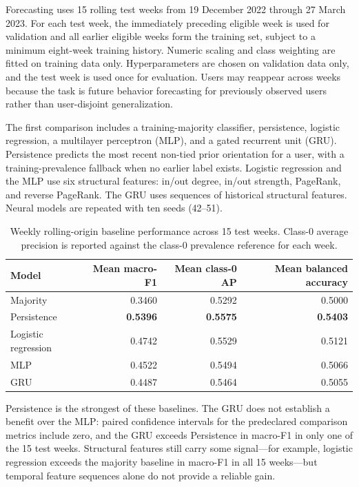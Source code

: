 \documentclass[11pt,a4paper]{article}
\begin{document}
Forecasting uses 15 rolling test weeks from 19 December 2022 through 27 March 2023. For each test week, the immediately preceding eligible week is used for validation and all earlier eligible weeks form the training set, subject to a minimum eight-week training history. Numeric scaling and class weighting are fitted on training data only. Hyperparameters are chosen on validation data only, and the test week is used once for evaluation. Users may reappear across weeks because the task is future behavior forecasting for previously observed users rather than user-disjoint generalization.

The first comparison includes a training-majority classifier, persistence, logistic regression, a multilayer perceptron (MLP), and a gated recurrent unit (GRU). Persistence predicts the most recent non-tied prior orientation for a user, with a training-prevalence fallback when no earlier label exists. Logistic regression and the MLP use six structural features: in/out degree, in/out strength, PageRank, and reverse PageRank. The GRU uses sequences of historical structural features. Neural models are repeated with ten seeds (42--51).

\begin{table}[H]
\centering
\small
\caption{Weekly rolling-origin baseline performance across 15 test weeks. Class-0 average precision is reported against the class-0 prevalence reference for each week.}
\label{tab:weeklybaselines}
\begin{tabular}{lrrr}
\toprule
Model & Mean macro-F1 & Mean class-0 AP & Mean balanced accuracy\\
\midrule
Majority & 0.3460 & 0.5292 & 0.5000\\
Persistence & \textbf{0.5396} & \textbf{0.5575} & \textbf{0.5403}\\
Logistic regression & 0.4742 & 0.5529 & 0.5121\\
MLP & 0.4522 & 0.5494 & 0.5066\\
GRU & 0.4487 & 0.5464 & 0.5055\\
\bottomrule
\end{tabular}
\end{table}

Persistence is the strongest of these baselines. The GRU does not establish a benefit over the MLP: paired confidence intervals for the predeclared comparison metrics include zero, and the GRU exceeds Persistence in macro-F1 in only one of the 15 test weeks. Structural features still carry some signal---for example, logistic regression exceeds the majority baseline in macro-F1 in all 15 weeks---but temporal feature sequences alone do not provide a reliable gain.
\end{document}
